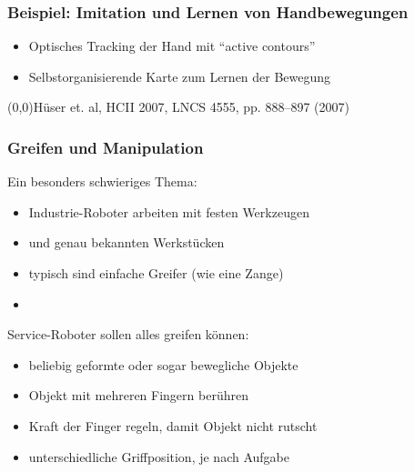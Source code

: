 \documentclass[t]{beamer}
\def\quelle#1{{\tiny \makebox(0,0){}\vfill\hfill #1}}
\def\ii{\item[]}
\begin{document}
\begin{frame}
\frametitle{Beispiel: Imitation und Lernen von Handbewegungen}
\begin{itemize}
\item Optisches Tracking der Hand mit "`active contours"'
\item Selbstorganisierende Karte zum Lernen der Bewegung
\end{itemize}
\quelle{Hüser et. al, HCII 2007, LNCS 4555, pp. 888–897 (2007)}
\end{frame}





\begin{frame}
\frametitle{Greifen und Manipulation}
\vspace*{-5mm}
Ein besonders schwieriges Thema:
\begin{itemize}
\item Industrie-Roboter arbeiten mit festen Werkzeugen
\item und genau bekannten Werkstücken
\item typisch sind einfache Greifer (wie eine Zange)
\ii
\end{itemize}
Service-Roboter sollen alles greifen können:
\begin{itemize}
\item beliebig geformte oder sogar bewegliche Objekte
\item Objekt mit mehreren Fingern berühren
\item Kraft der Finger regeln, damit Objekt nicht rutscht
\item unterschiedliche Griffposition, je nach Aufgabe
\end{itemize}
\end{frame}
\end{document}
